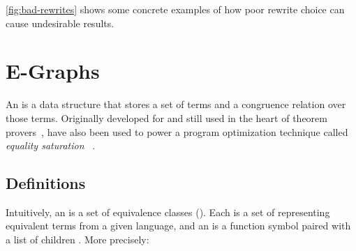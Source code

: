 \autoref{fig:bad-rewrites} shows some concrete examples of how
 poor rewrite choice can cause undesirable results.






\section{E-Graphs}
\label{sec:egraphs}

An \textit{\egraph} is a data structure that stores a set of terms and a
  congruence relation over those terms.
Originally developed for and still used in the
  heart of theorem provers~\cite{nelson, simplify, z3},
  \egraphs have also been used to power a program optimization technique
  called \textit{equality saturation}~%
  \cite{denali, eqsat, eqsat-llvm, szalinski, yogo-pldi20, spores, herbie}.

\subsection{Definitions}

Intuitively,
  an \egraph is a set of equivalence classes (\textit{\eclasses}).
Each \eclass is a set of \textit{\enodes} representing equivalent terms from a given language,
  and an \enode is a function symbol paired with a list of children \eclasses.
More precisely:

